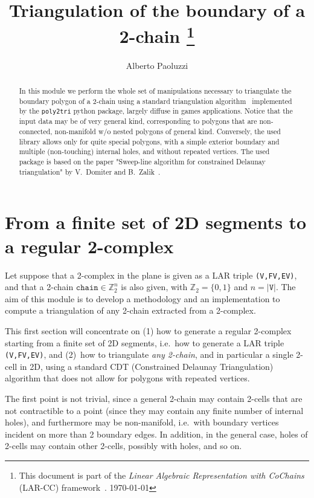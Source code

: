 \documentclass[11pt,oneside]{article}	%
\title{Triangulation of the boundary of a 2-chain
\footnote{This document is part of the \emph{Linear Algebraic Representation with CoChains} (LAR-CC) framework~\cite{cclar-proj:2013:00}. \today}
}
\author{Alberto Paoluzzi}
\def\Z{\mathbb{Z}}
\begin{document}
\maketitle
\nonstopmode

\begin{abstract}
In this module we perform the whole set of manipulations necessary to triangulate the boundary polygon of a 2-chain using a standard triangulation algorithm~\cite{} implemented by the \texttt{poly2tri} python package, largely diffuse in games applications.
Notice that the input data may be of very general kind, corresponding to polygons that are non-connected, non-manifold w/o nested polygons of general kind. Conversely, the used library allows only for quite special polygons, with a simple exterior boundary and multiple (non-touching) internal holes, and without repeated vertices. The used package is based on the paper "Sweep-line algorithm for constrained Delaunay triangulation" by V.~Domiter and B.~Zalik~\cite{poly2tri:2008}.
\end{abstract}

\tableofcontents


\section{From a finite set of 2D segments to a regular 2-complex}

Let suppose that a  2-complex in the plane is given as a LAR triple \texttt{(V,FV,EV)}, and that a 2-chain $\texttt{chain}\in\Z_2^n$ is also given, with $\Z_2=\{0,1\}$ and $n = |\texttt{V}|$.
The aim of this module is to develop a methodology and an implementation to compute a triangulation of any 2-chain extracted from a 2-complex. 

This first section will concentrate on (1) how to generate a regular 2-complex starting from a finite set of 2D segments, i.e.~how to generate a LAR triple \texttt{(V,FV,EV)},  and (2)~how to triangulate \emph{any 2-chain}, and in particular a single 2-cell in 2D, using a standard CDT  (Constrained Delaunay Triangulation) algorithm that does not allow for polygons with repeated vertices. 

The first point is not trivial, since a general 2-chain may contain 2-cells that are not contractible to a point (since they may contain any finite number of internal holes), and furthermore may be non-manifold, i.e.~with boundary vertices incident on more than 2 boundary edges. In addition, in the general case, holes of 2-cells may contain other 2-cells, possibly with holes, and so on. 
\end{document}
